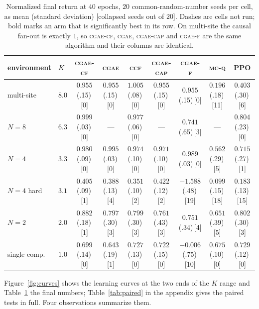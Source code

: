 \documentclass[review,authoryear,3p,times]{elsarticle}
\newcommand{\cgae}{\textsc{cgae}}              %
\newcommand{\cflow}{\textsc{cgae-cf}}          %
\newcommand{\cflowraw}{\textsc{cgae-f}}        %
\newcommand{\ccap}{\textsc{cgae-cap}}          %
\newcommand{\ccf}{\textsc{ccf}}
\newcommand{\mcq}{\textsc{mc-q}}
\begin{document}
\begin{table}[tbp]
\centering
\caption{Normalized final return at $40$ epochs, $20$ common-random-number
seeds per cell, as mean (standard deviation) [collapsed seeds out of $20$].
Dashes are cells not run; bold marks an arm that is significantly best in its
row. On multi-site the causal fan-out is exactly $1$, so \cflow, \cgae, \ccap{}
and \cflowraw{} are the same algorithm and their columns are identical.}
\label{tab:main}
\small
\begin{tabular}{llccccccc}
\toprule
environment & $K$ & \cflow & \cgae & \ccf & \ccap & \cflowraw & \mcq & PPO \\
\midrule
multi-site   & $8.0$ & $0.955$ \tiny{(.15)\,[0]} & $0.955$ \tiny{(.15)\,[0]}
             & $1.005$ \tiny{(.08)\,[0]} & $0.955$ \tiny{(.15)\,[0]} & $0.955$ \tiny{(.15)\,[0]}
             & $0.196$ \tiny{(.18)\,[11]} & $0.403$ \tiny{(.30)\,[6]} \\
$N{=}8$      & $6.3$ & $\mathbf{0.999}$ \tiny{(.03)\,[0]} & ---
             & $0.977$ \tiny{(.06)\,[0]} & --- & $0.741$ \tiny{(.65)\,[3]}
             & --- & $0.804$ \tiny{(.23)\,[0]} \\
$N{=}4$      & $3.3$ & $0.980$ \tiny{(.09)\,[0]} & $\mathbf{0.995}$ \tiny{(.03)\,[0]}
             & $0.974$ \tiny{(.10)\,[0]} & $0.971$ \tiny{(.10)\,[0]} & $0.989$ \tiny{(.03)\,[0]}
             & $0.562$ \tiny{(.29)\,[5]} & $0.715$ \tiny{(.27)\,[1]} \\
$N{=}4$ hard & $3.1$ & $0.405$ \tiny{(.09)\,[1]} & $0.388$ \tiny{(.13)\,[4]}
             & $0.351$ \tiny{(.10)\,[2]} & $0.422$ \tiny{(.12)\,[2]} & $-1.588$ \tiny{(.48)\,[19]}
             & $0.099$ \tiny{(.15)\,[18]} & $0.183$ \tiny{(.13)\,[15]} \\
$N{=}2$      & $2.0$ & $\mathbf{0.882}$ \tiny{(.18)\,[1]} & $0.797$ \tiny{(.30)\,[3]}
             & $0.799$ \tiny{(.30)\,[3]} & $0.761$ \tiny{(.43)\,[3]} & $0.751$ \tiny{(.34)\,[4]}
             & $0.651$ \tiny{(.39)\,[5]} & $0.802$ \tiny{(.30)\,[3]} \\
single comp. & $1.0$ & $0.699$ \tiny{(.14)\,[0]} & $0.643$ \tiny{(.19)\,[1]}
             & $0.727$ \tiny{(.13)\,[0]} & $0.722$ \tiny{(.15)\,[0]} & $-0.006$ \tiny{(.75)\,[10]}
             & $0.675$ \tiny{(.10)\,[0]} & $0.729$ \tiny{(.12)\,[0]} \\
\bottomrule
\end{tabular}
\end{table}

Figure~\ref{fig:curves} shows the learning curves at the two ends of the $K$
range and Table~\ref{tab:main} the final numbers; Table~\ref{tab:paired} in the
appendix gives the paired tests in full. Four observations summarize them.
\end{document}
